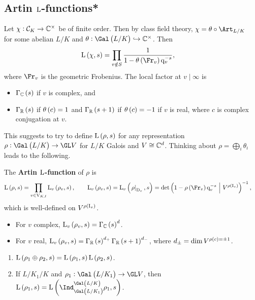 \subsection{Artin \texorpdfstring{$ \mathrm{L} $}{L}-functions*}

Let $ \chi : \mathcal{C}_K \to \mathbb{C}^\times $ be of finite order. Then by class field theory, $ \chi = \theta \circ \Art_{L / K} $ for some abelian $ L / K $ and $ \theta : \Gal\br{L / K} \hookrightarrow \CC^\times $. Then
$$ \L\br{\chi, s} = \prod_{v \notin S} \dfrac{1}{1 - \theta\br{\Fr_v}\q_v^{-s}}, $$
where $ \Fr_v $ is the geometric Frobenius. The local factor at $ v \mid \infty $ is
\begin{itemize}
\item $ \Gamma_\CC\br{s} $ if $ v $ is complex, and
\item $ \Gamma_\RR\br{s} $ if $ \theta\br{c} = 1 $ and $ \Gamma_\RR\br{s + 1} $ if $ \theta\br{c} = -1 $ if $ v $ is real, where $ c $ is complex conjugation at $ v $.
\end{itemize}
This suggests to try to define $ \L\br{\rho, s} $ for any representation $ \rho : \Gal\br{L / K} \to \GL V $ for $ L / K $ Galois and $ V \cong \mathbb{C}^d $. Thinking about $ \rho = \bigoplus_i \theta_i $ leads to the following.

\pagebreak

\begin{definition*}
The \textbf{Artin $ \mathrm{L} $-function} of $ \rho $ is
$$ \L\br{\rho, s} = \prod_{v \in \V_{K, \f}} \L_v\br{\rho_v, s}, \qquad \L_v\br{\rho_v, s} = \L_v\br{\eval{\rho}_{\D_v}, s} = \det\br{1 - \rho\br{\Fr_v}\q_v^{-s} \st V^{\rho\br{\I_v}}}^{-1}, $$
which is well-defined on $ V^{\rho\br{\I_v}} $.
\begin{itemize}
\item For $ v $ complex, $ \L_v\br{\rho_v, s} = \Gamma_\CC\br{s}^d $.
\item For $ v $ real, $ \L_v\br{\rho_v, s} = \Gamma_\RR\br{s}^{d_+}\Gamma_\RR\br{s + 1}^{d_-} $, where $ d_\pm = \dim V^{\rho\br{c} = \pm 1} $.
\end{itemize}
\end{definition*}

\begin{proposition}
\hfill
\begin{enumerate}
\item $ \L\br{\rho_1 \oplus \rho_2, s} = \L\br{\rho_1, s}\L\br{\rho_2, s} $.
\item If $ L / K_1 / K $ and $ \rho_1 : \Gal\br{L / K_1} \to \GL V $, then $ \L\br{\rho_1, s} = \L\br{\Ind_{\Gal\br{L / K_1}}^{\Gal\br{L / K}} \rho_1, s} $.
\end{enumerate}
\end{proposition}

